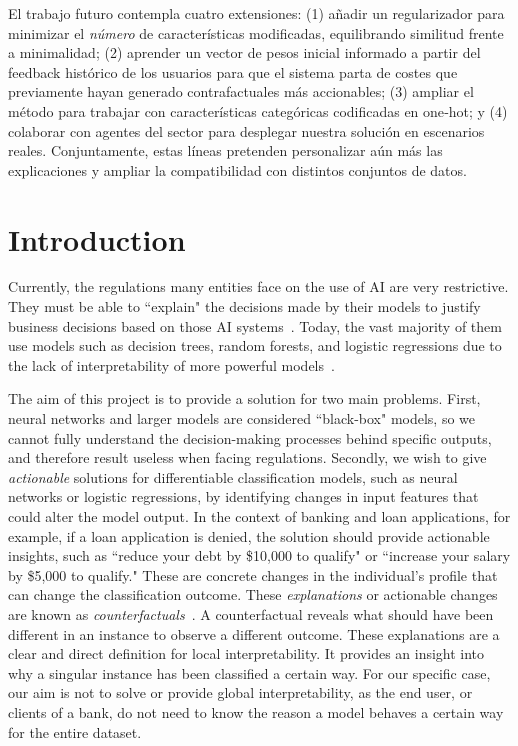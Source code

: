 \documentclass[12pt]{extarticle}
\numberwithin{equation}{section}
\begin{document}
El trabajo futuro contempla cuatro extensiones: (1) añadir un regularizador para minimizar el \emph{número} de características modificadas, equilibrando similitud frente a minimalidad; (2) aprender un vector de pesos inicial informado a partir del feedback histórico de los usuarios para que el sistema parta de costes que previamente hayan generado contrafactuales más accionables; (3) ampliar el método para trabajar con características categóricas codificadas en one‑hot; y (4) colaborar con agentes del sector para desplegar nuestra solución en escenarios reales. Conjuntamente, estas líneas pretenden personalizar aún más las explicaciones y ampliar la compatibilidad con distintos conjuntos de datos.

\newpage
\setcounter{page}{1}
\fancyfoot[C]{
    \begin{center}
        \thepage
    \end{center}
} 
\renewcommand{\footrulewidth}{0.4pt}
\setlength{\footskip}{0.8cm}
\section{Introduction}
Currently, the regulations many entities face on the use of AI are very restrictive. They must be able to ``explain" the decisions made by their models to justify business decisions based on those AI systems~\cite{cohen2021black}. Today, the vast majority of them use models such as decision trees, random forests, and logistic regressions due to the lack of interpretability of more powerful models~\cite{ghatasheh2014business,pointofview}. 

The aim of this project is to provide a solution for two main problems. First, neural networks and larger models are considered ``black-box" models, so we cannot fully understand the decision-making processes behind specific outputs, and therefore result useless when facing regulations. Secondly, we wish to give \emph{actionable} solutions for differentiable classification models, such as neural networks or logistic regressions, by identifying changes in input features that could alter the model output. In the context of banking and loan applications, for example, if a loan application is denied, the solution should provide actionable insights, such as ``reduce your debt by \$10,000 to qualify" or ``increase your salary by \$5,000 to qualify." These are concrete changes in the individual's profile that can change the classification outcome. These \emph{explanations} or actionable changes are known as \emph{counterfactuals}~\cite{wachter2017counterfactual,guidotti2024counterfactual}. A counterfactual reveals what should have been different in an instance to observe a different outcome. These explanations are a clear and direct definition for local interpretability. It provides an insight into why a singular instance has been classified a certain way. For our specific case, our aim is not to solve or provide global interpretability, as the end user, or clients of a bank, do not need to know the reason a model behaves a certain way for the entire dataset.
\end{document}
